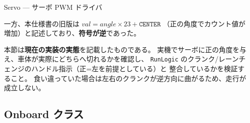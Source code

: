 \documentclass[a4paper,11pt,dvipdfmx]{jsarticle}
\begin{document}
\begin{apibox}{Servo --- サーボ PWM ドライバ}
\begin{cautionbox}
一方、本仕様書の旧版は $\mathit{val} = \mathit{angle} \times 23 + \mathtt{CENTER}$
（正の角度でカウント値が増加）と記述しており、\textbf{符号が逆}であった。

本節は\textbf{現在の実装の実態}を記載したものである。
実機でサーボに正の角度を与え、車体が実際にどちらへ切れるかを確認し、
\texttt{RunLogic} のクランク/レーンチェンジのハンドル指示（正=左を前提としている）と
整合しているかを検証すること。
食い違っていた場合は左右のクランクが逆方向に曲がるため、走行が成立しない。
\end{cautionbox}

\end{apibox}

\subsection{Onboard クラス}\label{sec:api-onboard}
\end{document}
